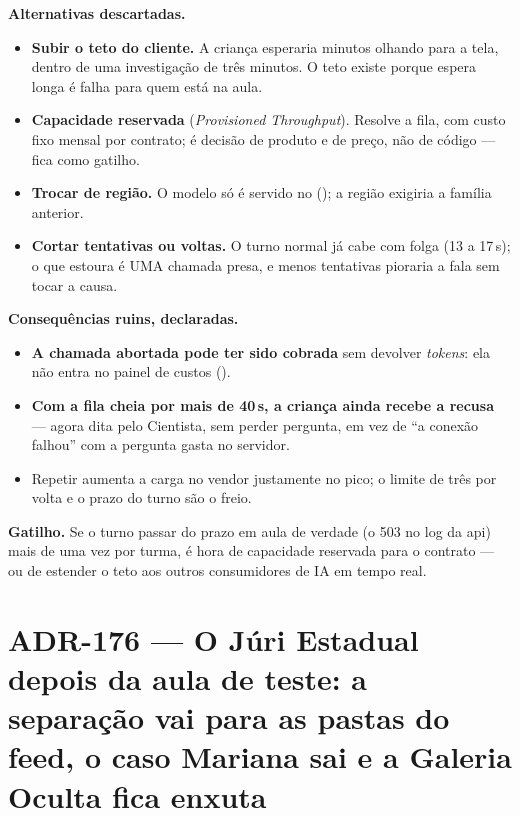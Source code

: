\textbf{Alternativas descartadas.}

\begin{itemize}
  \item \textbf{Subir o teto do cliente.} A criança esperaria minutos olhando
    para a tela, dentro de uma investigação de três minutos. O teto existe
    porque espera longa é falha para quem está na aula.
  \item \textbf{Capacidade reservada} (\emph{Provisioned Throughput}). Resolve
    a fila, com custo fixo mensal por contrato; é decisão de produto e de
    preço, não de código --- fica como gatilho.
  \item \textbf{Trocar de região.} O modelo só é servido no 
    (); a região exigiria a família anterior.
  \item \textbf{Cortar tentativas ou voltas.} O turno normal já cabe com
    folga (13 a 17\,s); o que estoura é UMA chamada presa, e menos
    tentativas pioraria a fala sem tocar a causa.
\end{itemize}

\textbf{Consequências ruins, declaradas.}

\begin{itemize}
  \item \textbf{A chamada abortada pode ter sido cobrada} sem devolver
    \emph{tokens}: ela não entra no painel de custos ().
  \item \textbf{Com a fila cheia por mais de 40\,s, a criança ainda recebe a
    recusa} --- agora dita pelo Cientista, sem perder pergunta, em vez de
    \enquote{a conexão falhou} com a pergunta gasta no servidor.
  \item Repetir aumenta a carga no vendor justamente no pico; o limite de
    três por volta e o prazo do turno são o freio.
\end{itemize}

\textbf{Gatilho.} Se o turno passar do prazo em aula de verdade (o 503
 no log da api) mais de uma vez por turma, é hora
de capacidade reservada para o contrato --- ou de estender o teto aos outros
consumidores de IA em tempo real.

\section{ADR-176 --- O Júri Estadual depois da aula de teste: a separação vai para as pastas do feed, o caso Mariana sai e a Galeria Oculta fica enxuta}
\label{adr:exp06ef1b-ajustes-do-time}

